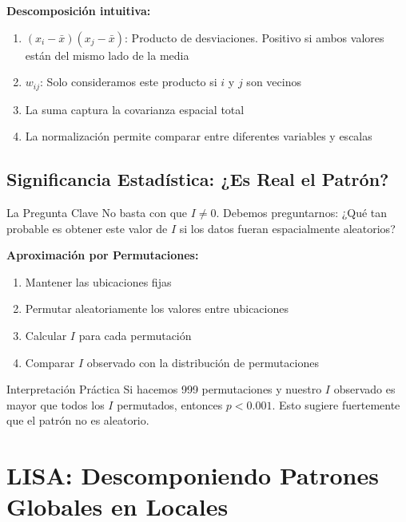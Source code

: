\documentclass[12pt,a4paper]{article}
\begin{document}
\textbf{Descomposición intuitiva:}

\begin{enumerate}
    \item $(x_i - \bar{x})(x_j - \bar{x})$: Producto de desviaciones. Positivo si ambos valores están del mismo lado de la media
    \item $w_{ij}$: Solo consideramos este producto si $i$ y $j$ son vecinos
    \item La suma captura la covarianza espacial total
    \item La normalización permite comparar entre diferentes variables y escalas
\end{enumerate}

\subsection{Significancia Estadística: ¿Es Real el Patrón?}

\begin{conceptbox}{La Pregunta Clave}
No basta con que $I \neq 0$. Debemos preguntarnos: ¿Qué tan probable es obtener este valor de $I$ si los datos fueran espacialmente aleatorios?
\end{conceptbox}

\textbf{Aproximación por Permutaciones:}
\begin{enumerate}
    \item Mantener las ubicaciones fijas
    \item Permutar aleatoriamente los valores entre ubicaciones
    \item Calcular $I$ para cada permutación
    \item Comparar $I$ observado con la distribución de permutaciones
\end{enumerate}

\begin{ejemplo}{Interpretación Práctica}
Si hacemos 999 permutaciones y nuestro $I$ observado es mayor que todos los $I$ permutados, entonces $p < 0.001$. Esto sugiere fuertemente que el patrón no es aleatorio.
\end{ejemplo}

\section{LISA: Descomponiendo Patrones Globales en Locales}
\end{document}

